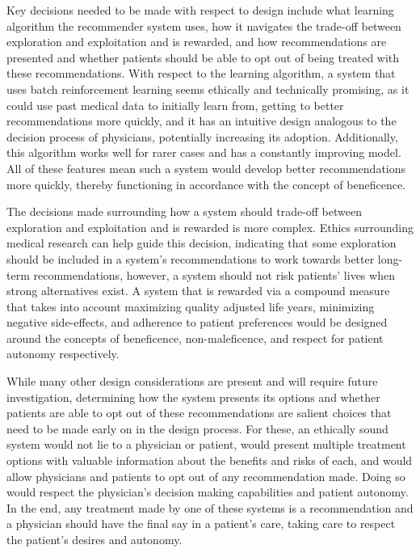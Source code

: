 \documentclass[]{spie}  %
\begin{document}
Key decisions needed to be made with respect to design include what learning algorithm the recommender system uses, how it navigates the trade-off between exploration and exploitation and is rewarded, and how recommendations are presented and whether patients should be able to opt out of being treated with these recommendations. With respect to the learning algorithm, a system that uses batch reinforcement learning seems ethically and technically promising, as it could use past medical data to initially learn from, getting to better recommendations more quickly, and it has an intuitive design analogous to the decision process of physicians, potentially increasing its adoption. Additionally, this algorithm works well for rarer cases and has a constantly improving model. All of these features mean such a system would develop better recommendations more quickly, thereby functioning in accordance with the concept of beneficence.

The decisions made surrounding how a system should  trade-off between exploration and exploitation and is rewarded is more complex. Ethics surrounding medical research can help guide this decision, indicating that some exploration should be included in a system’s recommendations to work towards better long-term recommendations, however, a system should not risk patients’ lives when strong alternatives exist. A system that is rewarded via a compound measure that takes into account maximizing quality adjusted life years, minimizing negative side-effects, and adherence to patient preferences would be designed around the concepts of beneficence, non-maleficence, and respect for patient autonomy respectively.

While many other design considerations are present and will require future investigation, determining how the system presents its options and whether patients are able to opt out of these recommendations are salient choices that need to be made early on in the design process. For these, an ethically sound system would not lie to a physician or patient, would present multiple treatment options with valuable information about the benefits and risks of each, and would allow physicians and patients to opt out of any recommendation made. Doing so would respect the physician’s decision making capabilities and patient autonomy. In the end, any treatment made by one of these systems is a recommendation and a physician should have the final say in a patient’s care, taking care to respect the patient’s desires and autonomy.
\end{document}
